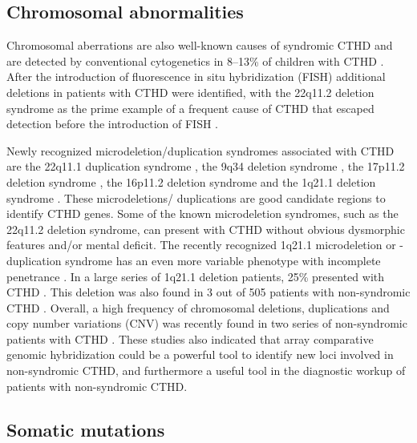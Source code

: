 \begin{refsection}
\subsection{Chromosomal abnormalities}

Chromosomal aberrations are also well-known causes of syndromic CTHD and are detected by conventional cytogenetics in 8–13\% of children with CTHD \cite{ferencz1989congenital}. After the introduction of fluorescence in situ hybridization (FISH) additional deletions in patients with CTHD were identified, with the 22q11.2 deletion syndrome as the prime example of a frequent cause of CTHD that escaped detection before the introduction of FISH \cite{thienpont2007submicroscopic}.

\begin{sloppypar} Newly recognized microdeletion/duplication syndromes associated with CTHD are the 22q11.1 duplication syndrome \cite{wentzel2008clinical}, the 9q34 deletion syndrome \cite{stewart2007chromosome}, the 17p11.2 deletion syndrome \cite{andrieux2007genotype}, the 16p11.2 deletion syndrome \cite{brunetti2008recurrent,hernando2002comparative} and the 1q21.1 deletion syndrome \cite{brunetti2008recurrent,mefford2008recurrent,christiansen2004chromosome}. These microdeletions/ duplications are good candidate regions to identify CTHD genes. Some of the known microdeletion syndromes, such as the 22q11.2 deletion syndrome, can present with CTHD without obvious dysmorphic features and/or mental deficit. The recently recognized 1q21.1 microdeletion or -duplication syndrome has an even more variable phenotype with incomplete penetrance \cite{brunetti2008recurrent,mefford2008recurrent,christiansen2004chromosome}. In a large series of 1q21.1 deletion patients, 25\% presented with CTHD \cite{mefford2008recurrent}. This deletion was also found in 3 out of 505 patients with non-syndromic CTHD \cite{christiansen2004chromosome}. Overall, a high frequency of chromosomal deletions, duplications and copy number variations (CNV) was recently found in two series of non-syndromic patients with CTHD \cite{erdogan2008high,greenway2009novo}. These studies also indicated that array comparative genomic hybridization could be a powerful tool to identify new loci involved in non-syndromic CTHD, and furthermore a useful tool in the diagnostic workup of patients with non-syndromic CTHD. \end{sloppypar}
 
\subsection{Somatic mutations}


\end{refsection}
